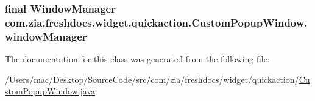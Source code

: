 \hypertarget{classcom_1_1zia_1_1freshdocs_1_1widget_1_1quickaction_1_1_custom_popup_window_adce54e21e2caf4468cece0f5e879bfdf}{
\subsubsection[{window\-Manager}]{\setlength{\rightskip}{0pt plus 5cm}final Window\-Manager com.\-zia.\-freshdocs.\-widget.\-quickaction.\-Custom\-Popup\-Window.\-window\-Manager\hspace{0.3cm}{\ttfamily [protected]}}}\label{classcom_1_1zia_1_1freshdocs_1_1widget_1_1quickaction_1_1_custom_popup_window_adce54e21e2caf4468cece0f5e879bfdf}


The documentation for this class was generated from the following file\-:\begin{DoxyCompactItemize}
\item 
/\-Users/mac/\-Desktop/\-Source\-Code/src/com/zia/freshdocs/widget/quickaction/\hyperlink{_custom_popup_window_8java}{Custom\-Popup\-Window.\-java}\end{DoxyCompactItemize}
